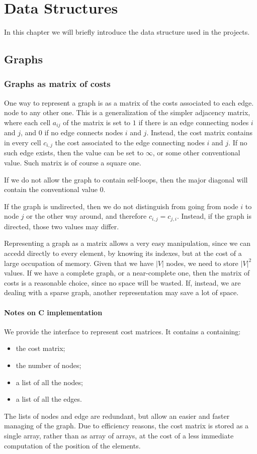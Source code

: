 \chapter{Data Structures}
In this chapter we will briefly introduce the data structure used in the projects.

\section{Graphs}
\subsection{Graphs as matrix of costs}
One way to represent a graph is as a matrix of the costs associated to each edge. node to any other one. This is a generalization of the simpler adjacency matrix, where each cell $a_{ij}$ of the matrix is set to $1$ if there is an edge connecting nodes $i$ and $j$, and $0$ if no edge connects nodes $i$ and $j$. Instead, the cost matrix contains in every cell $c_{i,j}$ the cost associated to the edge connecting nodes $i$ and $j$. If no such edge exists, then the value can be set to $\infty$, or some other conventional value. Such matrix is of course a square one.

If we do not allow the graph to contain self-loops, then the major diagonal will contain the conventional value $0$.

If the graph is undirected, then we do not distinguish from going from node $i$ to node $j$ or the other way around, and therefore $c_{i,j} = c_{j,i}$. Instead, if the graph is directed, those two values may differ.

Representing a graph as a matrix allows a very easy manipulation, since we can accedd directly to every element, by knowing its indexes, but at the cost of a large occupation of memory. Given that we have $|V|$ nodes, we need to store $|V|^2$ values. If we have a complete graph, or a near-complete one, then the matrix of costs is a reasonable choice, since no space will be wasted. If, instead, we are dealing with a sparse graph, another representation may save a lot of space.

\subsubsection{Notes on C implementation}
We provide the  interface to represent cost matrices. It contains a  containing:
\begin{itemize}[noitemsep]
  \item the cost matrix;
  \item the number of nodes;
  \item a list of all the nodes;
  \item a list of all the edges.
\end{itemize}

The lists of nodes and edge are redundant, but allow an easier and faster managing of the graph. Due to efficiency reasons, the cost matrix is stored as a single array, rather than as array of arrays, at the cost of a less immediate computation of the position of the elements.
